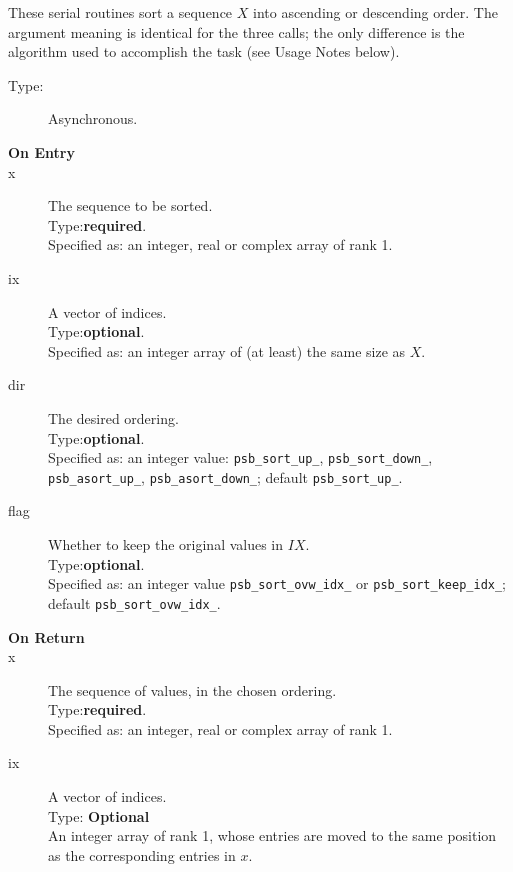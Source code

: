 These  serial routines sort a sequence $X$ into ascending or
descending  order. The argument meaning is identical for the three
calls; the only difference is the algorithm used to accomplish the
task (see Usage Notes below). 
\begin{description}
\item[Type:] Asynchronous.
\item[\bf  On Entry ]
\item[x] The sequence to be sorted.\\
Type:{\bf required}.\\
Specified as: an integer, real or complex  array of rank 1.
\item[ix] A vector of indices.\\
Type:{\bf optional}.\\
Specified as: an integer array of (at least) the same size as $X$.
\item[dir] The desired ordering.\\
Type:{\bf optional}.\\
Specified as: an integer value: \verb|psb_sort_up_|,
\verb|psb_sort_down_|, \verb|psb_asort_up_|, \verb|psb_asort_down_|;
default \verb|psb_sort_up_|. 
\item[flag] Whether to keep the original values in $IX$.\\
Type:{\bf optional}.\\
Specified as: an integer value \verb|psb_sort_ovw_idx_| or
\verb|psb_sort_keep_idx_|; default \verb|psb_sort_ovw_idx_|.

\end{description}

\begin{description}
\item[\bf On Return]
\item[x] The sequence of values, in the chosen ordering.\\ 
Type:{\bf required}.\\
Specified as: an integer, real or complex array of rank 1.
\item[ix] A vector of indices.\\
Type: {\bf Optional} \\
An integer array of rank 1, whose entries are moved to the same
position as the corresponding entries in $x$.
\end{description}
